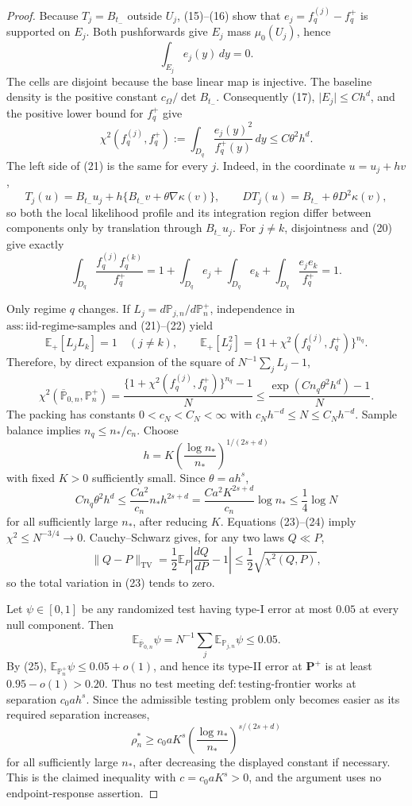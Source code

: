 \documentclass{article}
\begin{document}
\begin{proof}
Because \(T_j=B_{t_-}\) outside \(U_j\), (15)--(16) show that \(e_j=f_q^{(j)}-f_q^+\) is supported on \(E_j\).  Both pushforwards give \(E_j\) mass \(\mu_0(U_j)\), hence
\[
 \int_{E_j}e_j(y)\,dy=0.
 \tag{20}
\]
The cells are disjoint because the base linear map is injective.  The baseline density is the positive constant \(c_\Omega/\det B_{t_-}\).  Consequently (17), \(\lvert E_j\rvert\le Ch^d\), and the positive lower bound for \(f_q^+\) give
\[
 \chi^2(f_q^{(j)},f_q^+)
 :=\int_{D_q}\frac{e_j(y)^2}{f_q^+(y)}\,dy
 \le C\theta^2h^d.
 \tag{21}
\]
The left side of (21) is the same for every \(j\).  Indeed, in the coordinate \(u=u_j+hv\),
\[
 T_j(u)=B_{t_-}u_j+h\{B_{t_-}v+\theta\nabla\kappa(v)\},
 \qquad
 DT_j(u)=B_{t_-}+\theta D^2\kappa(v),
\]
so both the local likelihood profile and its integration region differ between components only by translation through \(B_{t_-}u_j\).  For \(j\ne k\), disjointness and (20) give exactly
\[
 \int_{D_q}\frac{f_q^{(j)}f_q^{(k)}}{f_q^+}
 =1+\int_{D_q}e_j+\int_{D_q}e_k+\int_{D_q}\frac{e_je_k}{f_q^+}=1.
 \tag{22}
\]

Only regime \(q\) changes.  If \(L_j=d\mathbb P_{j,n}/d\mathbb P_n^+\), independence in \(\mathrm{ass:iid\text{-}regime\text{-}samples}\) and (21)--(22) yield
\[
 \mathbb E_+[L_jL_k]=1\quad(j\ne k),
 \qquad
 \mathbb E_+[L_j^2]=\{1+\chi^2(f_q^{(j)},f_q^+)\}^{n_q}.
\]
Therefore, by direct expansion of the square of \(N^{-1}\sum_jL_j-1\),
\[
 \chi^2(\overline{\mathbb P}_{0,n},\mathbb P_n^+)
 =\frac{\{1+\chi^2(f_q^{(j)},f_q^+)\}^{n_q}-1}{N}
 \le\frac{\exp(Cn_q\theta^2h^d)-1}{N}.
 \tag{23}
\]
The packing has constants \(0<c_N<C_N<\infty\) with \(c_Nh^{-d}\le N\le C_Nh^{-d}\).  Sample balance implies \(n_q\le n_\ast/c_n\).  Choose
\[
 h=K\left(\frac{\log n_\ast}{n_\ast}\right)^{1/(2s+d)}
\]
with fixed \(K>0\) sufficiently small.  Since \(\theta=ah^s\),
\[
 Cn_q\theta^2h^d
 \le \frac{Ca^2}{c_n}n_\ast h^{2s+d}
 =\frac{Ca^2K^{2s+d}}{c_n}\log n_\ast
 \le\frac14\log N
 \tag{24}
\]
for all sufficiently large \(n_\ast\), after reducing \(K\).  Equations (23)--(24) imply \(\chi^2\le N^{-3/4}\to0\).  Cauchy--Schwarz gives, for any two laws \(Q\ll P\),
\[
 \lVert Q-P\rVert_{\mathrm{TV}}
 =\frac12\mathbb E_P\left\lvert\frac{dQ}{dP}-1\right\rvert
 \le\frac12\sqrt{\chi^2(Q,P)},
 \tag{25}
\]
so the total variation in (23) tends to zero.

Let \(\psi\in[0,1]\) be any randomized test having type-I error at most \(0.05\) at every null component.  Then
\[
 \mathbb E_{\overline{\mathbb P}_{0,n}}\psi
 =N^{-1}\sum_j\mathbb E_{\mathbb P_{j,n}}\psi\le0.05.
\]
By (25), \(\mathbb E_{\mathbb P_n^+}\psi\le0.05+o(1)\), and hence its type-II error at \(\mathbf P^+\) is at least \(0.95-o(1)>0.20\).  Thus no test meeting \(\mathrm{def:testing\text{-}frontier}\) works at separation \(c_0ah^s\).  Since the admissible testing problem only becomes easier as its required separation increases,
\[
 \rho_n^\ast\ge c_0aK^s
 \left(\frac{\log n_\ast}{n_\ast}\right)^{s/(2s+d)}
\]
for all sufficiently large \(n_\ast\), after decreasing the displayed constant if necessary.  This is the claimed inequality with \(c=c_0aK^s>0\), and the argument uses no endpoint-response assertion.
\end{proof}
\end{document}
